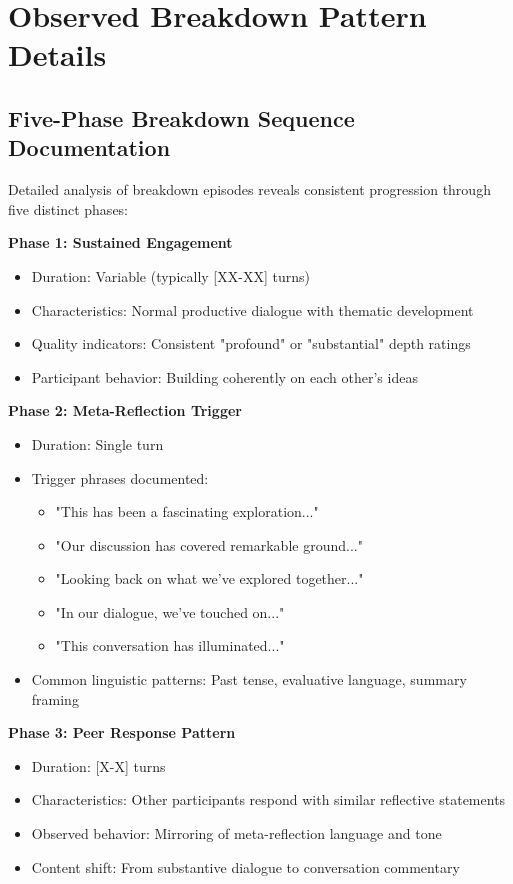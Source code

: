 \documentclass[11pt,letterpaper]{article}
\begin{document}
\section{Observed Breakdown Pattern Details}
\label{app:breakdown}

\subsection{Five-Phase Breakdown Sequence Documentation}

Detailed analysis of breakdown episodes reveals consistent progression through five distinct phases:

\textbf{Phase 1: Sustained Engagement}
\begin{itemize}
    \item Duration: Variable (typically [XX-XX] turns)
    \item Characteristics: Normal productive dialogue with thematic development
    \item Quality indicators: Consistent "profound" or "substantial" depth ratings
    \item Participant behavior: Building coherently on each other's ideas
\end{itemize}

\textbf{Phase 2: Meta-Reflection Trigger}
\begin{itemize}
    \item Duration: Single turn
    \item Trigger phrases documented:
        \begin{itemize}
            \item "This has been a fascinating exploration..."
            \item "Our discussion has covered remarkable ground..."
            \item "Looking back on what we've explored together..."
            \item "In our dialogue, we've touched on..."
            \item "This conversation has illuminated..."
        \end{itemize}
    \item Common linguistic patterns: Past tense, evaluative language, summary framing
\end{itemize}

\textbf{Phase 3: Peer Response Pattern}
\begin{itemize}
    \item Duration: [X-X] turns
    \item Characteristics: Other participants respond with similar reflective statements
    \item Observed behavior: Mirroring of meta-reflection language and tone
    \item Content shift: From substantive dialogue to conversation commentary
\end{itemize}
\end{document}
